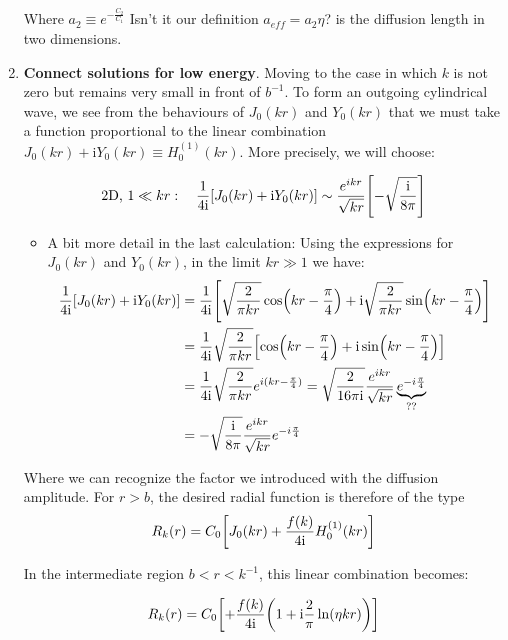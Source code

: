 \begin{enumerate}
    Where $a_2\equiv e^{-\frac{C_2}{C_1}}$ \color{red}Isn't it our definition $a_{eff}=a_2\eta$? \color{black} is the diffusion length in two dimensions.
    \item \textbf{Connect solutions for low energy}. Moving to the case in which $k$ is not zero but remains very small in front of $b^{-1}$. To form an outgoing cylindrical wave, we see from the behaviours of $J_0(kr)$ and $Y_0(kr)$ that we must take a function proportional to the linear combination $J_0(kr)+\text{i}Y_0(kr)\equiv H_0^{(1)}(kr)$. More precisely, we will choose:
    
    \begin{equation}
        \text{2D, } 1\ll kr: \quad \frac{1}{4\text{i}}\qty[J_0(kr)+\text{i}Y_0(kr)]\sim \frac{e^{ikr}}{\sqrt{kr}}\qty[-\sqrt{\frac{\text{i}}{8\pi}}]
    \end{equation}

    \begin{itemize}
        \item A bit more detail in the last calculation:
        Using the expressions for $J_0(kr)$ and $Y_0(kr)$, in the limit $kr\gg 1$ we have:
        \begin{align*}
            \frac{1}{4\text{i}}\qty[J_0(kr)+\text{i}Y_0(kr)]&= \frac{1}{4\text{i}}\qty[\sqrt{\frac{2}{\pi kr}}\cos(kr-\frac{\pi}{4})+\text{i}\sqrt{\frac{2}{\pi kr}}\sin(kr-\frac{\pi}{4})] \\
            & = \frac{1}{4\text{i}}\sqrt{\frac{2}{\pi kr}}\qty[\cos(kr-\frac{\pi}{4})+\text{i}\sin(kr-\frac{\pi}{4})] \\
            & = \frac{1}{4\text{i}}\sqrt{\frac{2}{\pi kr}}e^{i(kr-\frac{\pi}{4})} 
             = \sqrt{\frac{2}{16\pi \text{i}}}\frac{e^{ikr}}{\sqrt{kr}}\underbrace{e^{-i\frac{\pi}{4}}}_{??}\\
            & = -\sqrt{\frac{\text{i}}{8\pi}}\frac{e^{ikr}}{\sqrt{kr}}e^{-i\frac{\pi}{4}}
        \end{align*}
    \end{itemize}
    Where we can recognize the factor we introduced with the diffusion amplitude. For $r>b$, the desired radial function is therefore of the type
    \begin{equation}
        R_k(r)=C_0\qty[J_0(kr)+\frac{f(k)}{4\text{i}}H_0^{(1)}(kr)]
    \end{equation}

    In the intermediate region $b<r<k^{-1}$, this linear combination becomes:

    \begin{equation}
        R_k(r)=C_0\qty[+\frac{f(k)}{4\text{i}}\qty(1+\text{i}\frac{2}{\pi}\ln(\eta kr))]
    \end{equation}


\end{enumerate}
